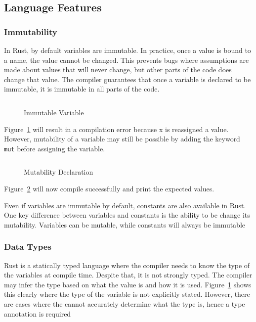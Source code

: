 \documentclass{article}
\newcommand{\rust}[1]{\inputminted{rust}{samples/rust/#1.rs}}
\newcommand{\rustin}[1]{\texttt{#1}}
\begin{document}
  \subsection{Language Features}

  \subsubsection{Immutability}
  In Rust, by default variables are immutable. In practice, once a value is
  bound to a name, the value cannot be changed. This prevents bugs where
  assumptions are made about values that will never change, but other parts of
  the code does change that value. The compiler guarantees that once a variable
  is declared to be immutable, it is immutable in all parts of the code.

  \begin{figure}[ht]
    \rust{immutability}
    \caption{Immutable Variable}
    \label{fig:immut}
  \end{figure}

  Figure~\ref{fig:immut} will result in a compilation error because x is
  reassigned a value. However, mutability of a variable may still be possible by
  adding the keyword \rustin{mut} before assigning the variable.

  \begin{figure}[ht]
    \rust{mutability}
    \caption{Mutability Declaration}
    \label{fig:mut}
  \end{figure}

  Figure~\ref{fig:mut} will now compile successfully and print the expected
  values.

  Even if variables are immutable by default, constants are also available in
  Rust. One key difference between variables and constants is the ability to be
  change its mutability. Variables can be mutable, while constants will always
  be immutable

  \subsubsection{Data Types}
  Rust is a statically typed language where the compiler needs to know the type
  of the variables at compile time. Despite that, it is not strongly typed. The
  compiler may infer the type based on what the value is and how it is used.
  Figure~\ref{fig:immut} shows this clearly where the type of the variable is
  not explicitly stated. However, there are cases where the cannot accurately
  determine what the type is, hence a type annotation is required
\end{document}
